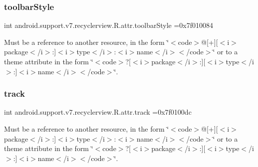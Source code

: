 \subsubsection{\texorpdfstring{toolbar\+Style}{toolbarStyle}}
{\footnotesize\ttfamily int android.\+support.\+v7.\+recyclerview.\+R.\+attr.\+toolbar\+Style =0x7f010084\hspace{0.3cm}{\ttfamily [static]}}

Must be a reference to another resource, in the form \char`\"{}$<$code$>$@\mbox{[}+\mbox{]}\mbox{[}$<$i$>$package$<$/i$>$\+:\mbox{]}$<$i$>$type$<$/i$>$\+:$<$i$>$name$<$/i$>$$<$/code$>$\char`\"{} or to a theme attribute in the form \char`\"{}$<$code$>$?\mbox{[}$<$i$>$package$<$/i$>$\+:\mbox{]}\mbox{[}$<$i$>$type$<$/i$>$\+:\mbox{]}$<$i$>$name$<$/i$>$$<$/code$>$\char`\"{}. \mbox{\label{classandroid_1_1support_1_1v7_1_1recyclerview_1_1R_1_1attr_a71089b6d21116d5d7a23954f4f212044}} 
\subsubsection{\texorpdfstring{track}{track}}
{\footnotesize\ttfamily int android.\+support.\+v7.\+recyclerview.\+R.\+attr.\+track =0x7f0100dc\hspace{0.3cm}{\ttfamily [static]}}

Must be a reference to another resource, in the form \char`\"{}$<$code$>$@\mbox{[}+\mbox{]}\mbox{[}$<$i$>$package$<$/i$>$\+:\mbox{]}$<$i$>$type$<$/i$>$\+:$<$i$>$name$<$/i$>$$<$/code$>$\char`\"{} or to a theme attribute in the form \char`\"{}$<$code$>$?\mbox{[}$<$i$>$package$<$/i$>$\+:\mbox{]}\mbox{[}$<$i$>$type$<$/i$>$\+:\mbox{]}$<$i$>$name$<$/i$>$$<$/code$>$\char`\"{}. \mbox{\label{classandroid_1_1support_1_1v7_1_1recyclerview_1_1R_1_1attr_aaeae321fc3b1a48c466ee85c5dcd1353}} 
